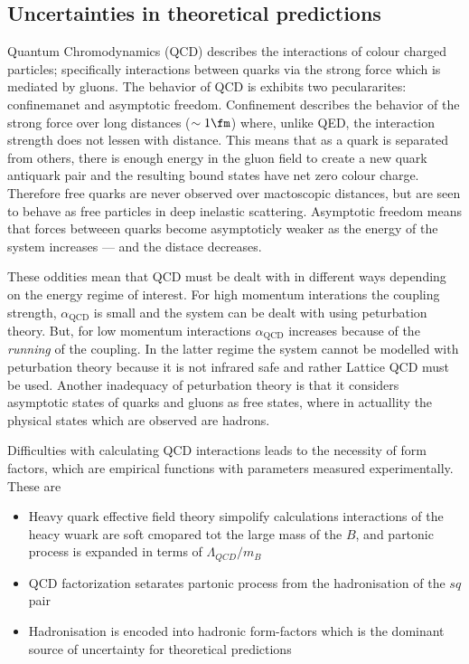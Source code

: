\subsection{Uncertainties in theoretical predictions}

Quantum Chromodynamics (QCD) describes the interactions of colour charged particles; specifically
interactions between quarks via the strong force which is mediated by gluons.
The behavior of QCD is exhibits two peculararites: confinemanet and asymptotic freedom.
Confinement describes the behavior of the strong force over long distances ($\sim1\fm$)
where, unlike QED, the interaction strength does not lessen with distance.
This means that as a quark is separated from others, there is enough energy in the gluon field to
create a new quark antiquark pair and the resulting bound states have net zero colour charge.
Therefore free quarks are never observed over mactoscopic distances, but are seen to behave as free
particles in deep inelastic scattering.
Asymptotic freedom means that forces betweeen quarks become asymptoticly weaker as the energy of
the system increases --- and the distace decreases.

These oddities mean that QCD must be dealt with in different ways depending on the energy regime of
interest.
For high momentum interations the coupling strength, $\alpha_\mathrm{QCD}$ is small and the system
can be dealt with using peturbation theory.
But, for low momentum interactions $\alpha_\mathrm{QCD}$ increases because of the
\emph{running} of the coupling.
In the latter regime the system cannot be modelled with peturbation theory because it is not
infrared safe and rather Lattice QCD must be used.
Another inadequacy of peturbation theory is that it considers asymptotic states of quarks and
gluons as free states, where in actuallity the physical states which are observed are hadrons.

Difficulties with calculating QCD interactions leads to the necessity of form factors, which are
empirical functions with parameters measured experimentally.
These are


\begin{itemize}
  \item Heavy quark effective field theory simpolify calculations
    interactions of the heacy wuark are soft cmopared tot the large mass of the $B$, and partonic
    process is expanded in terms of $\Lambda_{QCD}/m_B$
  \item QCD factorization setarates partonic process from the hadronisation of the $sq$ pair
  \item Hadronisation is encoded into hadronic form-factors which is the dominant source of
    uncertainty for theoretical predictions
\end{itemize}






